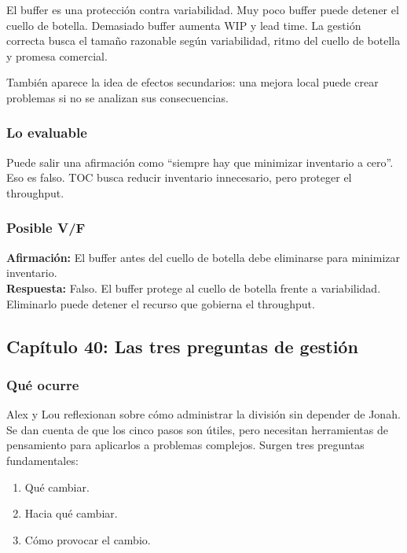 \documentclass[
  11pt,
]{article}
\providecommand{\tightlist}{%
  \setlength{\itemsep}{0pt}\setlength{\parskip}{0pt}}
\begin{document}
El buffer es una protección contra variabilidad. Muy poco buffer puede
detener el cuello de botella. Demasiado buffer aumenta WIP y lead time.
La gestión correcta busca el tamaño razonable según variabilidad, ritmo
del cuello de botella y promesa comercial.

También aparece la idea de efectos secundarios: una mejora local puede
crear problemas si no se analizan sus consecuencias.

\hypertarget{lo-evaluable-12}{%
\subsubsection{Lo evaluable}\label{lo-evaluable-12}}

Puede salir una afirmación como ``siempre hay que minimizar inventario a
cero''. Eso es falso. TOC busca reducir inventario innecesario, pero
proteger el throughput.

\hypertarget{posible-vf-12}{%
\subsubsection{Posible V/F}\label{posible-vf-12}}

\textbf{Afirmación:} El buffer antes del cuello de botella debe
eliminarse para minimizar inventario.\\
\textbf{Respuesta:} Falso. El buffer protege al cuello de botella frente
a variabilidad. Eliminarlo puede detener el recurso que gobierna el
throughput.

\hypertarget{capuxedtulo-40-las-tres-preguntas-de-gestiuxf3n}{%
\subsection{Capítulo 40: Las tres preguntas de
gestión}\label{capuxedtulo-40-las-tres-preguntas-de-gestiuxf3n}}

\hypertarget{quuxe9-ocurre-13}{%
\subsubsection{Qué ocurre}\label{quuxe9-ocurre-13}}

Alex y Lou reflexionan sobre cómo administrar la división sin depender
de Jonah. Se dan cuenta de que los cinco pasos son útiles, pero
necesitan herramientas de pensamiento para aplicarlos a problemas
complejos. Surgen tres preguntas fundamentales:

\begin{enumerate}
\def\labelenumi{\arabic{enumi}.}
\tightlist
\item
  Qué cambiar.
\item
  Hacia qué cambiar.
\item
  Cómo provocar el cambio.
\end{enumerate}
\end{document}
